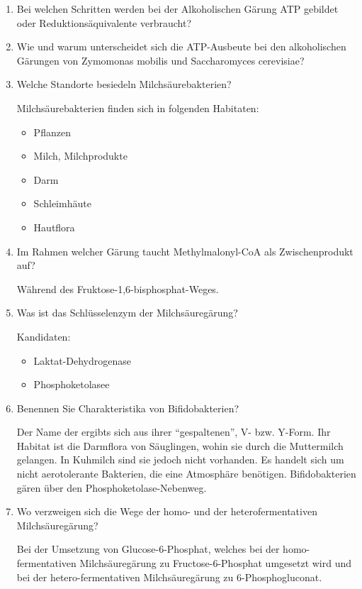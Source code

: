 \begin{enumerate}
	\item Bei welchen Schritten werden bei der Alkoholischen Gärung ATP gebildet oder Reduktionsäquivalente verbraucht?
	\item Wie und warum unterscheidet sich die ATP-Ausbeute bei den alkoholischen Gärungen von Zymomonas mobilis und Saccharomyces cerevisiae?
	\item Welche Standorte besiedeln Milchsäurebakterien?
		
		Milchsäurebakterien finden sich in folgenden Habitaten:
		\begin{itemize}
			\item Pflanzen
			\item Milch, Milchprodukte
			\item Darm
			\item Schleimhäute
			\item Hautflora
		\end{itemize}

	\item Im Rahmen welcher Gärung taucht Methylmalonyl-CoA als Zwischenprodukt auf?
		
		Während des Fruktose-1,6-bisphosphat-Weges.

	\item Was ist das Schlüsselenzym der Milchsäuregärung?

		Kandidaten:
		\begin{itemize}
			\item Laktat-Dehydrogenase
			\item Phosphoketolasee
		\end{itemize}

	\item Benennen Sie Charakteristika von Bifidobakterien?
		
		Der Name der ergibts sich aus ihrer ``gespaltenen'', V- bzw. Y-Form.
		Ihr Habitat ist die Darmflora von Säuglingen,
		wohin sie durch die Muttermilch gelangen.
		In Kuhmilch sind sie jedoch nicht vorhanden.
		Es handelt sich um nicht aerotolerante Bakterien,
		die eine  Atmosphäre benötigen.
		Bifidobakterien gären über den Phosphoketolase-Nebenweg.

	\item Wo verzweigen sich die Wege der homo- und der heterofermentativen Milchsäuregärung?
		
		Bei der Umsetzung von Glucose-6-Phosphat,
		welches bei der homo-fermentativen Milchsäuregärung zu Fructose-6-Phosphat umgesetzt wird
		und bei der hetero-fermentativen Milchsäuregärung zu 6-Phosphogluconat.


\end{enumerate}
